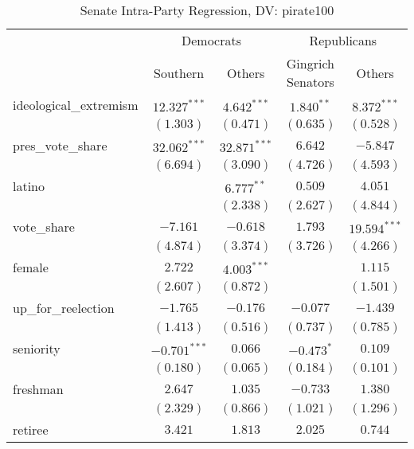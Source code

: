 \documentclass[12pt]{article}
\begin{document}
\begin{table}[H]
	\begin{center}
		\caption{Senate Intra-Party Regression, DV: pirate100}
		\begin{tabular}{l c c c c }
			\hline
			& \multicolumn{2}{c}{Democrats} & \multicolumn{2}{c}{Republicans} \\
			\cline{2-5}
			& Southern & Others & Gingrich Senators & Others \\
			\hline
			ideological\_extremism & $12.327^{***}$ & $4.642^{***}$  & $1.840^{**}$   & $8.372^{***}$   \\
			& $(1.303)$      & $(0.471)$      & $(0.635)$      & $(0.528)$       \\
			pres\_vote\_share      & $32.062^{***}$ & $32.871^{***}$ & $6.642$        & $-5.847$        \\
			& $(6.694)$      & $(3.090)$      & $(4.726)$      & $(4.593)$       \\
			latino                 &                & $6.777^{**}$   & $0.509$        & $4.051$         \\
			&                & $(2.338)$      & $(2.627)$      & $(4.844)$       \\
			vote\_share            & $-7.161$       & $-0.618$       & $1.793$        & $19.594^{***}$  \\
			& $(4.874)$      & $(3.374)$      & $(3.726)$      & $(4.266)$       \\
			female                 & $2.722$        & $4.003^{***}$  &                & $1.115$         \\
			& $(2.607)$      & $(0.872)$      &                & $(1.501)$       \\
			up\_for\_reelection    & $-1.765$       & $-0.176$       & $-0.077$       & $-1.439$        \\
			& $(1.413)$      & $(0.516)$      & $(0.737)$      & $(0.785)$       \\
			seniority              & $-0.701^{***}$ & $0.066$        & $-0.473^{*}$   & $0.109$         \\
			& $(0.180)$      & $(0.065)$      & $(0.184)$      & $(0.101)$       \\
			freshman               & $2.647$        & $1.035$        & $-0.733$       & $1.380$         \\
			& $(2.329)$      & $(0.866)$      & $(1.021)$      & $(1.296)$       \\
			retiree                & $3.421$        & $1.813$        & $2.025$        & $0.744$         \\

\end{tabular}
\end{center}
\end{table}
\end{document}
